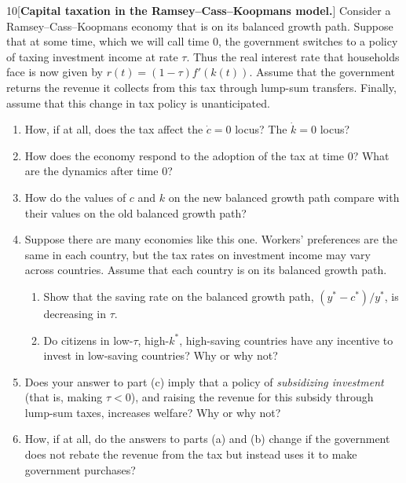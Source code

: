 \begin{problem}{10}[\textbf{Capital taxation in the Ramsey--Cass--Koopmans model.}]
Consider a Ramsey--Cass--Koopmans economy that is on its balanced growth path. Suppose that at some time, which we will call time 0, the government switches to a policy of taxing investment income at rate \(\tau\). Thus the real interest rate that households face is now given by \(r\left(t\right)=\left(1-\tau\right)f'\left(k\left(t\right)\right)\). Assume that the government returns the revenue it collects from this tax through lump-sum transfers. Finally, assume that this change in tax policy is unanticipated.
\begin{enumerate}[label=(\alph*)]
    \item How, if at all, does the tax affect the \(\dot{c}=0\) locus? The \(\dot{k}=0\) locus?
    \item How does the economy respond to the adoption of the tax at time 0? What are the dynamics after time 0?
    \item How do the values of \(c\) and \(k\) on the new balanced growth path compare with their values on the old balanced growth path?
    \item
    Suppose there are many economies like this one. Workers' preferences are the same in each country, but the tax rates on investment income may vary across countries. Assume that each country is on its balanced growth path.
    \begin{enumerate}[label=(\roman*)]
        \item Show that the saving rate on the balanced growth path, \(\left(y^*-c^*\right)/y^*\), is decreasing in \(\tau\).
        \item Do citizens in low-\(\tau\), high-\(k^*\), high-saving countries have any incentive to invest in low-saving countries? Why or why not?
    \end{enumerate}
    \item Does your answer to part (c) imply that a policy of \emph{subsidizing investment} (that is, making \(\tau<0\)), and raising the revenue for this subsidy through lump-sum taxes, increases welfare? Why or why not?
    \item How, if at all, do the answers to parts (a) and (b) change if the government does not rebate the revenue from the tax but instead uses it to make government purchases?
\end{enumerate}
\end{problem}

